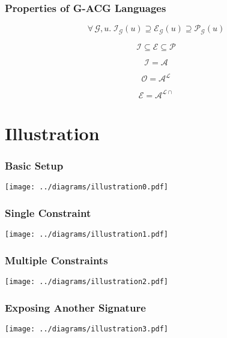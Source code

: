 \documentclass{beamer}
\begin{document}
\begin{frame}
  \frametitle{Properties of G-ACG Languages}

  $$\forall \, \mathcal{G}, u. \; \mathcal{I}_{\mathcal{G}}(u) \supseteq
  \mathcal{E}_{\mathcal{G}}(u) \supseteq \mathcal{P}_{\mathcal{G}}(u)$$

  $$\mathcal{I} \subseteq \mathcal{E} \subseteq \mathcal{P}$$

  $$\mathcal{I} = \mathcal{A}$$

  $$\mathcal{O} = \mathcal{A}^{\mathcal{L}}$$

  $$\mathcal{E} = \mathcal{A}^{\mathcal{L}{\cap}}$$
\end{frame}

\section{Illustration}



\begin{frame}
  \frametitle{Basic Setup}
  \begin{center}
    \texttt{[image: ../diagrams/illustration0.pdf]}
  \end{center}
\end{frame}



\begin{frame}
  \addtocounter{framenumber}{-1}
  \frametitle{Single Constraint}
  \begin{center}
    \texttt{[image: ../diagrams/illustration1.pdf]}
  \end{center}
\end{frame}


\begin{frame}
  \addtocounter{framenumber}{-1}
  \frametitle{Multiple Constraints}
  \begin{center}
    \texttt{[image: ../diagrams/illustration2.pdf]}
  \end{center}
\end{frame}


\begin{frame}
  \addtocounter{framenumber}{-1}
  \frametitle{Exposing Another Signature}
  \begin{center}
    \texttt{[image: ../diagrams/illustration3.pdf]}
  \end{center}
\end{frame}
\end{document}
